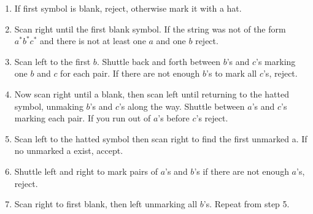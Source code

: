 \documentclass{article}
\begin{document}
    \begin{enumerate}[1)]

    \item If first symbol is blank, reject, otherwise mark it with a hat.

    \item Scan right until the first blank symbol. If the string was not of the form
    $a^*b^*c^*$ and there is not at least one $a$ and one $b$ reject.

    \item Scan left to the first $b$. Shuttle back and forth between $b$'s and 
    $c$'s marking one $b$ and $c$ for each pair. If there are not enough $b$'s
    to mark all $c$'s, reject.

    \item Now scan right until a blank, then scan left until returning to the
    hatted symbol, unmaking $b$'s and $c$'s along the way. Shuttle between $a$'s
    and $c$'s marking each pair. If you run out of $a$'s before $c$'s reject.

    \item Scan left to the hatted symbol then scan right to find the first
    unmarked a. If no unmarked a exist, accept.

    \item Shuttle left and right to mark pairs of $a$'s and $b$'s if there
    are not enough $a$'s, reject.

    \item Scan right to first blank, then left unmarking all $b$'s. Repeat from
    step 5.

    \end{enumerate}

    
\end{document}
